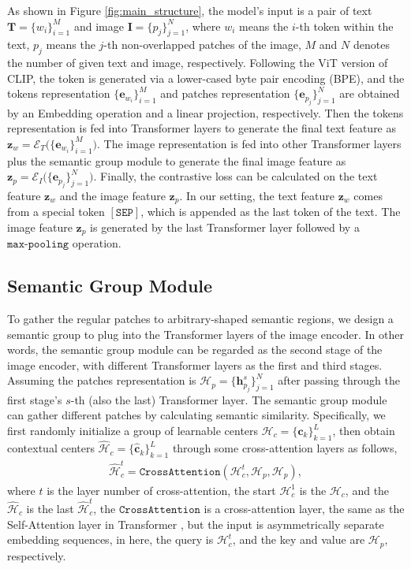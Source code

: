 \documentclass{article}
\theoremstyle{plain}
\theoremstyle{definition}
\theoremstyle{remark}
\begin{document}
As shown in Figure \ref{fig:main_structure}, the model's input is a pair of text $\mathbf{T}=\{w_i\}_{i=1}^{M}$ and image $\mathbf{I}=\{p_j\}_{j=1}^{N}$, where $w_i$ means the $i$-th token within the text, $p_j$ means the $j$-th non-overlapped patches of the image, $M$ and $N$ denotes the number of given text and image, respectively. Following the ViT version of CLIP, the token is generated via a lower-cased byte pair encoding (BPE), and the tokens representation $\{\mathbf{e}_{w_i}\}_{i=1}^{M}$ and patches representation $\{\mathbf{e}_{p_j}\}_{j=1}^{N}$ are obtained by an Embedding operation and a linear projection, respectively. Then the tokens representation is fed into Transformer layers \cite{Vaswani2017} to generate the final text feature as $\mathbf{z}_w = \mathcal{E}_T\big(\{\mathbf{e}_{w_i}\}_{i=1}^{M}\big)$. The image representation is fed into other Transformer layers plus the semantic group module to generate the final image feature as $\mathbf{z}_p = \mathcal{E}_I\big(\{\mathbf{e}_{p_j}\}_{j=1}^{N}\big)$. Finally, the contrastive loss can be calculated on the text feature $\mathbf{z}_w$ and the image feature $\mathbf{z}_p$. In our setting, the text feature $\mathbf{z}_w$ comes from a special token $\mathtt{[SEP]}$, which is appended as the last token of the text. The image feature $\mathbf{z}_p$ is generated by the last Transformer layer followed by a $\texttt{max-pooling}$ operation.

\subsection{Semantic Group Module}
To gather the regular patches to arbitrary-shaped semantic regions, we design a semantic group to plug into the Transformer layers of the image encoder. In other words, the semantic group module can be regarded as the second stage of the image encoder, with different Transformer layers as the first and third stages. Assuming the patches representation is $\mathcal{H}_p=\{\mathbf{h}_{p_j}^s\}_{j=1}^{N}$ after passing through the first stage's $s$-th (also the last) Transformer layer. The semantic group module can gather different patches by calculating semantic similarity. Specifically, we first randomly initialize a group of learnable centers $\mathcal{H}_c=\{\mathbf{c}_k\}_{k=1}^L$, then obtain contextual centers $\hat{\mathcal{H}}_c=\{\hat{\mathbf{c}}_k\}_{k=1}^L$ through some cross-attention layers as follows,
\begin{align}
	\hat{\mathcal{H}}_c^t = \texttt{CrossAttention}(\mathcal{H}_c^t, \mathcal{H}_p, \mathcal{H}_p),
\end{align}
where $t$ is the layer number of cross-attention, the start $\mathcal{H}_c^1$ is the $\mathcal{H}_c$, and the $\hat{\mathcal{H}}_c$ is the last $\hat{\mathcal{H}}_c^t$, the $\texttt{CrossAttention}$ is a cross-attention layer, the same as the Self-Attention layer in Transformer \cite{Vaswani2017}, but the input is asymmetrically separate embedding sequences, in here, the query is $\mathcal{H}_c^t$, and the key and value are $\mathcal{H}_p$, respectively.
\end{document}
